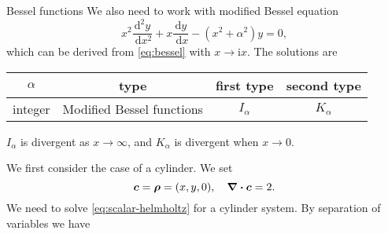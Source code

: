 \documentclass[hyperref, a4paper]{article}
\newcommand*{\ii}{\mathrm{i}}
\begin{document}
\begin{info*}{Bessel functions}{}
    We also need to work with modified Bessel equation 
    \begin{equation}
        x^{2} \frac{\mathrm{d}^{2} y}{\mathrm{~d} x^{2}}+x \frac{\mathrm{d} y}{\mathrm{~d} x}-\left(x^{2}+\alpha^{2}\right) y=0,
    \end{equation}
    which can be derived from \eqref{eq:bessel} with $x \to \ii x$. The solutions are 
    \begin{center}
        \begin{tabular}{cccc}
            \toprule
            $\alpha$ & type & first type & second type \\
            \midrule
            integer & Modified Bessel functions & $I_\alpha$ & $K_\alpha$ \\
            \bottomrule
        \end{tabular}
    \end{center}

    $I_\alpha$ is divergent as $x \to \infty$, and $K_\alpha$ is divergent when $x \to 0$.
\end{info*}

We first consider the case of a cylinder. We set 
\begin{equation}
    \vb*{c} = \vb*{\rho} = (x,y,0), \quad \div{\vb*{c}} = 2. 
\end{equation}
We need to solve \eqref{eq:scalar-helmholtz} for a cylinder system. By separation of variables we have 
\end{document}
